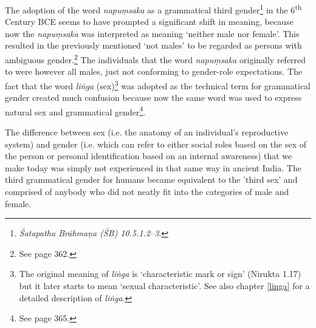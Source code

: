 The adoption of the word {\em napuṃsaka} as a grammatical third gender\footnote{{\em Śatapatha Brāhmaṇa (ŚB) 10.5.1.2–3}.} in the 6\textsuperscript{th} Century BCE seems to have prompted a significant shift in meaning, because now the {\em napuṃsaka} was interpreted as meaning `neither male nor female'. This resulted in the previously mentioned `not males' to be regarded as persons with ambiguous gender.\footnote{See \cite{zwilling2000} page 362.} The individuals that the word {\em napuṃsaka} originally referred to were however all males, just not conforming to gender-role expectations. The fact that the word {\em liṅga} (sex)\footnote{The original meaning of {\em liṅga} is `characteristic mark or sign' (Nirukta 1.17) but it later starts to mean `sexual characteristic'. See also chapter \ref{linga} for a detailed description of {\em liṅga}.} was adopted as the technical term for grammatical gender created much confusion because now the same word was used to express natural sex and grammatical gender\footnote{See \cite{zwilling} page 365.}.


The difference between sex (i.e. the anatomy of an individual's reproductive system) and gender (i.e. which can refer to either social roles based on the sex of the person or personal identification based on an internal awareness) that we make today was simply not experienced in that same way in ancient India. The third grammatical gender for humans became equivalent to the 'third sex' and comprised of anybody who did not neatly fit into the categories of male and female.

